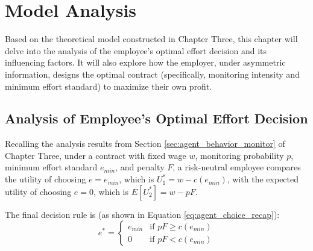 \chapter{Model Analysis}
\label{chap:analysis}

Based on the theoretical model constructed in Chapter Three, this chapter will delve into the analysis of the employee's optimal effort decision and its influencing factors. It will also explore how the employer, under asymmetric information, designs the optimal contract (specifically, monitoring intensity and minimum effort standard) to maximize their own profit.

\section{Analysis of Employee's Optimal Effort Decision}
\label{sec:agent_decision_analysis}

Recalling the analysis results from Section \ref{sec:agent_behavior_monitor} of Chapter Three, under a contract with fixed wage $w$, monitoring probability $p$, minimum effort standard $e_{min}$, and penalty $F$, a risk-neutral employee compares the utility of choosing $e=e_{min}$, which is $U_1^* = w - c(e_{min})$, with the expected utility of choosing $e=0$, which is $E[U_2^*] = w - pF$.

The final decision rule is (as shown in Equation \ref{eq:agent_choice_recap}):
\begin{equation} \label{eq:agent_choice_recap}
e^* = \begin{cases} e_{min} & \text{if } pF \ge c(e_{min}) \\ 0 & \text{if } pF < c(e_{min}) \end{cases}
\end{equation}

